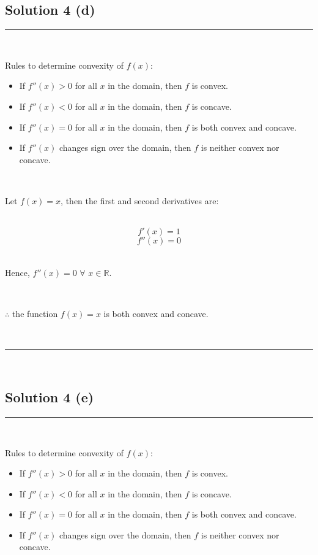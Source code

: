 \documentclass{article}
\begin{document}
\subsection*{Solution 4 (d)}
\noindent\rule{\textwidth}{0.4pt}\\

\parbox{\textwidth}{
Rules to determine convexity of $f(x)$:
\begin{itemize}
    \item If $f''(x) > 0$ for all $x$ in the domain, then $f$ is convex.
    \item If $f''(x) < 0$ for all $x$ in the domain, then $f$ is concave.
    \item If $f''(x) = 0$ for all $x$ in the domain, then $f$ is both convex and concave.
    \item If $f''(x)$ changes sign over the domain, then $f$ is neither convex nor concave.
\end{itemize}
}\\

\parbox{\textwidth}{
Let $f(x) = x$, then the first and second derivatives are:
}\\

$$f'(x) = 1$$
$$f''(x) = 0$$\\

\parbox{\textwidth}{
Hence, $f''(x) = 0$ $\forall$ $x \in \mathbb{R}$.
}\\

\parbox{\textwidth}{
$\therefore$ the function $f(x) = x$ is both convex and concave.
}\\

\noindent\rule{\textwidth}{0.4pt}\\

\newpage

\subsection*{Solution 4 (e)}
\noindent\rule{\textwidth}{0.4pt}\\

\parbox{\textwidth}{
Rules to determine convexity of $f(x)$:
\begin{itemize}
    \item If $f''(x) > 0$ for all $x$ in the domain, then $f$ is convex.
    \item If $f''(x) < 0$ for all $x$ in the domain, then $f$ is concave.
    \item If $f''(x) = 0$ for all $x$ in the domain, then $f$ is both convex and concave.
    \item If $f''(x)$ changes sign over the domain, then $f$ is neither convex nor concave.
\end{itemize}
}\\
\end{document}
